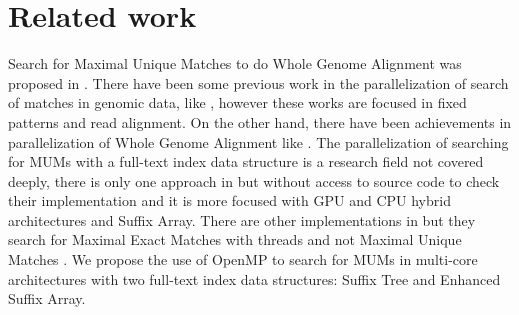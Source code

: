 \documentclass[runningheads,a5paper]{llncs}
\begin{document}
\section{Related work}
Search for Maximal Unique Matches to do Whole Genome Alignment was proposed in \cite{Delcher1999}. There have been some previous work in the parallelization of search of matches in genomic data, like \cite{OguzhanKulekci2011,Mongelli,Kouzinopoulos2005}, however these works are focused in fixed patterns and read alignment. On the other hand, there have been achievements in parallelization of Whole Genome Alignment like \cite{Meng2005}. The parallelization of searching for MUMs with a full-text index data structure is a research field not covered deeply, there is only one approach in \cite{Encarnac2011} but without access to source code to check their implementation and it is more focused with GPU and CPU hybrid architectures and Suffix Array. There are other implementations in \cite{Vyverman2013,OguzhanKulekci2011,Khan2009,OhlebuschGK10} but they search for Maximal Exact Matches with threads and not Maximal Unique Matches . We propose the use of OpenMP to search for MUMs in multi-core architectures with two full-text index data structures: Suffix Tree and Enhanced Suffix Array.
\end{document}
